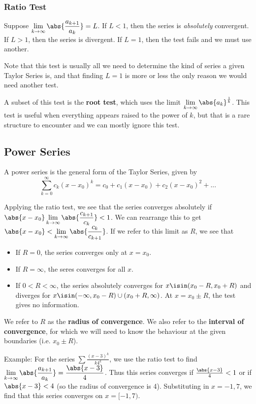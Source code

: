 \documentclass[12pt]{article}
\begin{document}
\subsubsection*{Ratio Test}
Suppose $\displaystyle\lim_{k\to\infty} \abs{\frac{a_{k+1}}{a_k}} = L$. If $L < 1$, then the series is \emph{absolutely} convergent. If $L > 1$, then the series is divergent. If $L = 1$, then the test fails and we must use another.

Note that this test is usually all we need to determine the kind of series a given Taylor Series is, and that finding $L = 1$ is more or less the only reason we would need another test.

A subset of this test is the {\bf root test}, which uses the limit $\displaystyle\lim_{k\to\infty} \abs{a_k}^\frac{1}{k}$. This test is useful when everything appears raised to the power of $k$, but that is a rare structure to encounter and we can mostly ignore this test.

\subsection*{Power Series}
A power series is the general form of the Taylor Series, given by \[ \sum_{k=0}^\infty c_k (x - x_0)^k = c_0 + c_1(x-x_0) + c_2(x-x_0)^2 + ... \]

Applying the ratio test, we see that the series converges absolutely if $\abs{x - x_0} \displaystyle\lim_{k\to\infty} \abs{\frac{c_{k+1}}{c_k}} < 1$. We can rearrange this to get $\abs{x - x_0} < \displaystyle\lim_{k\to\infty} \abs{\frac{c_k}{c_{k+1}}}$. If we refer to this limit as $R$, we see that
\begin{itemize}
\item If $R = 0$, the series converges only at $x = x_0$.
\item If $R = \infty$, the seres converges for all $x$.
\item If $0 < R < \infty$, the series absolutely converges for $x \isin (x_0 - R, x_0 + R)$ and diverges for $x \isin (-\infty,x_0 - R) \cup (x_0 + R, \infty)$. At $x = x_0 \pm R$, the test gives no information.
\end{itemize}

We refer to $R$ as the {\bf radius of convergence}. We also refer to the {\bf interval of convergence}, for which we will need to know the behaviour at the given boundaries (i.e. $x_0 \pm R$).

Example: For the series $\sum \frac{(x-3)^k}{k4^k}$, we use the ratio test to find $\displaystyle\lim_{k\to\infty} \abs{\frac{a_{k+1}}{a_k}} = \frac{\abs{x-3}}{4}$. Thus this series converges if $
\frac{\abs{x-3}}{4} < 1$ or if $\abs{x-3} < 4$ (so the radius of convergence is 4). Substituting in $x = -1, 7$, we find that this series converges on $x = [-1, 7)$.
\end{document}
